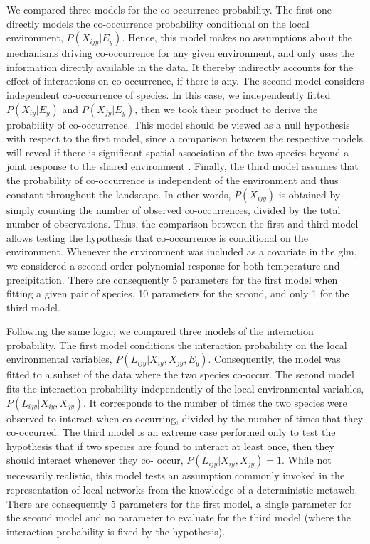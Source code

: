 \documentclass[12pt]{article}
\begin{document}
We compared three models for the co-occurrence probability. The first one
directly models the co-occurrence probability conditional on the local
environment, $P(X_{ijy} |E_y)$. Hence, this model makes no assumptions about the
mechanisms driving co-occurrence for any given environment, and only uses the
information directly available in the data. It thereby indirectly accounts for
the effect of interactions on co-occurrence, if there is any. The second model
considers independent co-occurrence of species. In this case, we independently
fitted $P(X_{iy} |E_y)$ and $P(X_{jy} |E_y)$, then we took their product to derive the
probability of co-occurrence. This model should be viewed as a null hypothesis
with respect to the first model, since a comparison between the respective
models will reveal if there is significant spatial association of the two
species beyond a joint response to the shared environment \citep{Cazelles2015}.
Finally, the third model assumes that the probability of co-occurrence is
independent of the environment and thus constant throughout the landscape. In
other words, $P(X_{ijy})$ is obtained by simply counting the number of observed
co-occurrences, divided by the total number of observations. Thus, the
comparison between the first and third model allows testing the hypothesis
that co-occurrence is conditional on the environment. Whenever the environment
was included as a covariate in the glm, we considered a second-order
polynomial response for both temperature and precipitation. There are
consequently 5 parameters for the first model when fitting a given pair of
species, 10 parameters for the second, and only 1 for the third model.

Following the same logic, we compared three models of the interaction
probability. The first model conditions the interaction probability on the
local environmental variables, $P(L_{ijy} |X_{iy},X_{jy},E_y)$. Consequently,
the model was fitted to a subset of the data where the two species co-occur.
The second model fits the interaction probability independently of the local
environmental variables, $P(L_{ijy} |X_{iy},X_{jy})$. It corresponds to the
number of times the two species were observed to interact when co-occurring,
divided by the number of times that they co-occurred. The third model is an
extreme case performed only to test the hypothesis that if two species are
found to interact at least once, then they should interact whenever they co-
occur, $P(L_{ijy} |X_{iy},X_{jy})=1$. While not necessarily realistic, this
model tests an assumption commonly invoked in the representation of local
networks from the knowledge of a deterministic metaweb. There are consequently
5 parameters for the first model, a single parameter for the second model and
no parameter to evaluate for the third model (where the interaction
probability is fixed by the hypothesis).
\end{document}
